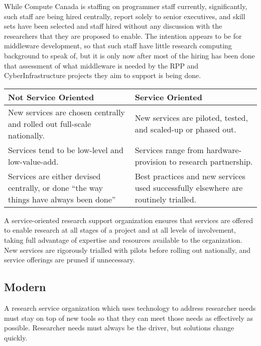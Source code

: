 \documentclass[11pt]{article}
\begin{document}
While Compute Canada is staffing on programmer staff currently,
significantly, such staff are being hired centrally, report solely
to senior executives, and skill sets have been selected and staff
hired without any discussion with the researchers that they are
proposed to enable.  The intention appears to be for middleware
development, so that such staff have little research computing
background to speak of, but it is only now after most of the hiring
has been done that assessment of what middleware is needed by the
RPP and CyberInfrastructure projects they aim to support is being
done.

\begin{table}[ht]
\centering
\small {\sffamily
{}
\begin{tabular}{p{2.5in}|p{2.5in}}
\textcolor{cdaRed}{\textbf{Not Service Oriented}} & \textcolor{cdaRed}{\textbf{Service Oriented}} \\
\hline
\hline
New services are chosen centrally and rolled out full-scale nationally. & New services are piloted, tested, and scaled-up or phased out.\\
Services tend to be low-level and low-value-add. & Services range from hardware-provision to research partnership.\\
Services are either devised centrally, or done \enquote{the way things have always been done} & Best practices and new services used successfully elsewhere are routinely trialled. \\
\hline
\end{tabular}
}
\end{table}

A service-oriented research support organization ensures that services are offered
to enable research at all stages of a project and at all levels of involvement,
taking full advantage of expertise and resources available to the organization.
New services are rigorously trialled with pilots before rolling out nationally, 
and service offerings are pruned if unnecessary.

\subsection*{Modern}

A research service organization which uses technology to address
researcher needs must stay on top of new tools so that they can
meet those needs as effectively as possible.  Researcher needs must
always be the driver, but solutions change quickly.
\end{document}
